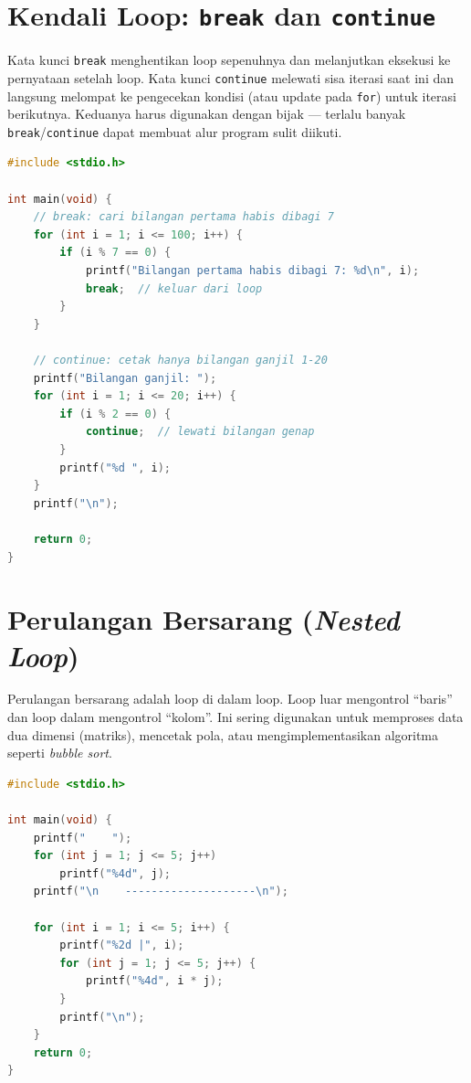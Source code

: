 \documentclass[../main.tex]{subfiles}
\begin{document}
\section{Kendali Loop: \texttt{break} dan \texttt{continue}}

Kata kunci \texttt{break} menghentikan loop sepenuhnya dan melanjutkan eksekusi ke pernyataan setelah loop. Kata kunci \texttt{continue} melewati sisa iterasi saat ini dan langsung melompat ke pengecekan kondisi (atau update pada \texttt{for}) untuk iterasi berikutnya. Keduanya harus digunakan dengan bijak --- terlalu banyak \texttt{break}/\texttt{continue} dapat membuat alur program sulit diikuti.

\begin{lstlisting}[language=C,caption=\texttt{break} dan \texttt{continue}]
#include <stdio.h>

int main(void) {
    // break: cari bilangan pertama habis dibagi 7
    for (int i = 1; i <= 100; i++) {
        if (i % 7 == 0) {
            printf("Bilangan pertama habis dibagi 7: %d\n", i);
            break;  // keluar dari loop
        }
    }
    
    // continue: cetak hanya bilangan ganjil 1-20
    printf("Bilangan ganjil: ");
    for (int i = 1; i <= 20; i++) {
        if (i % 2 == 0) {
            continue;  // lewati bilangan genap
        }
        printf("%d ", i);
    }
    printf("\n");
    
    return 0;
}
\end{lstlisting}

\section{Perulangan Bersarang (\textit{Nested Loop})}

Perulangan bersarang adalah loop di dalam loop. Loop luar mengontrol ``baris'' dan loop dalam mengontrol ``kolom''. Ini sering digunakan untuk memproses data dua dimensi (matriks), mencetak pola, atau mengimplementasikan algoritma seperti \textit{bubble sort}.

\begin{lstlisting}[language=C,caption=Tabel perkalian $5 \times 5$]
#include <stdio.h>

int main(void) {
    printf("    ");
    for (int j = 1; j <= 5; j++)
        printf("%4d", j);
    printf("\n    --------------------\n");
    
    for (int i = 1; i <= 5; i++) {
        printf("%2d |", i);
        for (int j = 1; j <= 5; j++) {
            printf("%4d", i * j);
        }
        printf("\n");
    }
    return 0;
}
\end{lstlisting}
\end{document}
